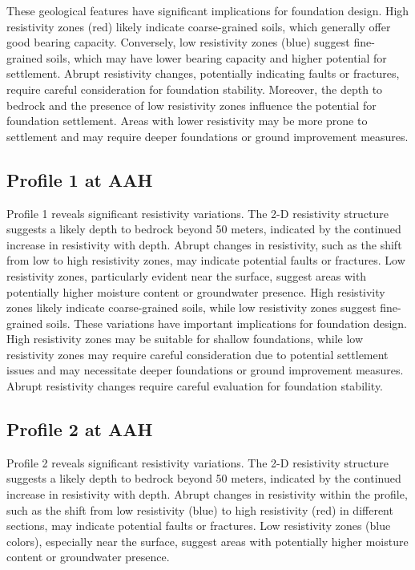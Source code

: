 \documentclass[12pt,a4paper]{report}
\begin{document}
These geological features have significant implications for foundation design. High resistivity zones (red) likely indicate coarse-grained soils, which generally offer good bearing capacity. Conversely, low resistivity zones (blue) suggest fine-grained soils, which may have lower bearing capacity and higher potential for settlement. Abrupt resistivity changes, potentially indicating faults or fractures, require careful consideration for foundation stability. Moreover, the depth to bedrock and the presence of low resistivity zones influence the potential for foundation settlement. Areas with lower resistivity may be more prone to settlement and may require deeper foundations or ground improvement measures.

\subsection{Profile 1 at AAH}
Profile 1 reveals significant resistivity variations. The 2-D resistivity structure suggests a likely depth to bedrock beyond 50 meters, indicated by the continued increase in resistivity with depth. Abrupt changes in resistivity, such as the shift from low to high resistivity zones, may indicate potential faults or fractures. Low resistivity zones, particularly evident near the surface, suggest areas with potentially higher moisture content or groundwater presence. High resistivity zones likely indicate coarse-grained soils, while low resistivity zones suggest fine-grained soils. These variations have important implications for foundation design. High resistivity zones may be suitable for shallow foundations, while low resistivity zones may require careful consideration due to potential settlement issues and may necessitate deeper foundations or ground improvement measures. Abrupt resistivity changes require careful evaluation for foundation stability.

\subsection{Profile 2 at AAH}
Profile 2 reveals significant resistivity variations. The 2-D resistivity structure suggests a likely depth to bedrock beyond 50 meters, indicated by the continued increase in resistivity with depth. Abrupt changes in resistivity within the profile, such as the shift from low resistivity (blue) to high resistivity (red) in different sections, may indicate potential faults or fractures. Low resistivity zones (blue colors), especially near the surface, suggest areas with potentially higher moisture content or groundwater presence.
\end{document}
